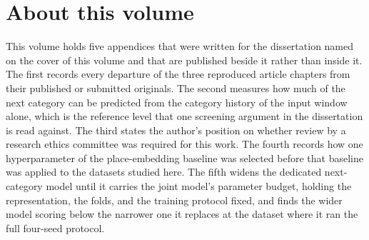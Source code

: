 \documentclass[
    12pt,
    openright,
    oneside,
    a4paper,
    sumario=tradicional,
    brazil,
    english,
]{abntex2}
\renewcommand{\contentsname}{Contents}
\begin{document}
    \frenchspacing
    \OnehalfSpacing

    \pretextual
    {
        \singlespacing
        \imprimirfolhaderosto
        \clearpage
    }

    \pdfbookmark[0]{\contentsname}{toc}
    \tableofcontents*
    \cleardoublepage

    \textual


    \chapter*{About this volume}
    \hypertarget{ext:dissertation}{}

    This volume holds five appendices that were
    written for the dissertation named on the
    cover of this volume and that are published beside it rather than inside it. The first
    records every departure of the three reproduced article chapters from their published or
    submitted originals. The second measures how much of the next category can be predicted from
    the category history of the input window alone, which is the reference level that one screening
    argument in the dissertation is read against. The third states the author's position on
    whether review by a research ethics committee was required for this work. The fourth records how
    one hyperparameter of the place-embedding baseline was selected before that baseline was applied
    to the datasets studied here. The fifth widens the dedicated next-category model until it carries
    the joint model's parameter budget, holding the representation, the folds, and the training
    protocol fixed, and finds the wider model scoring below the narrower one it replaces at the
    dataset where it ran the full four-seed protocol.
\end{document}
